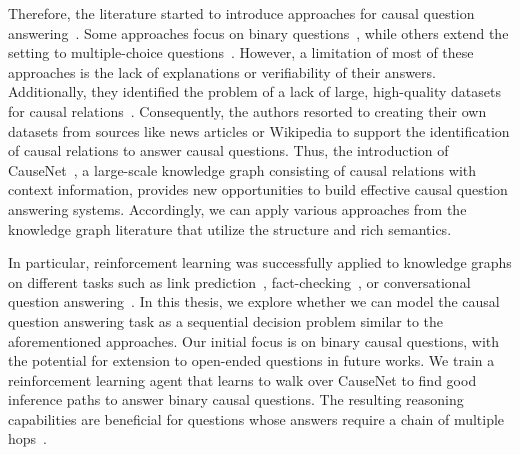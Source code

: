 Therefore, the literature started to introduce approaches for causal question answering~\cite{SharpCausalQAEmbeddings2016, HassanzadeshCausalQA2019, KayeshCausalTransfer2020, DalalCausalQAISWC2021}. 
Some approaches focus on binary questions~\cite{HassanzadeshCausalQA2019, KayeshCausalTransfer2020}, 
while others extend the setting to multiple-choice questions~\cite{SharpCausalQAEmbeddings2016, DalalCausalQAISWC2021}.
However, a limitation of most of these approaches is the lack of explanations or verifiability of their answers. 
Additionally, they identified the problem of a lack of large, high-quality datasets for causal relations~\cite{SharpCausalQAEmbeddings2016, HassanzadeshCausalQA2019, KayeshCausalTransfer2020}. 
Consequently, the authors resorted to creating their own datasets from sources like news articles or Wikipedia to support the identification of causal relations to answer causal questions. 
Thus, the introduction of CauseNet~\cite{Heindorf2020Causenet}, a large-scale knowledge graph consisting of causal relations with context information, provides new opportunities to build effective causal question answering systems. 
Accordingly, we can apply various approaches from the knowledge graph literature that utilize the structure and rich semantics.

In particular, reinforcement learning was successfully applied to knowledge graphs on different tasks such as link prediction~\cite{Xiong2017DeePpath}, 
fact-checking~\cite{Das2018Minerva}, or conversational question answering~\cite{Kaiser2021Reinforcement}. 
In this thesis, we explore whether we can model the
causal question answering task as a sequential decision problem similar to the aforementioned approaches.
Our initial focus is on binary causal questions, with the potential for extension to open-ended questions in future works.
We train a reinforcement learning agent that learns to walk over CauseNet to find good inference paths to answer binary causal questions.
 The resulting reasoning capabilities are beneficial for questions whose answers require a chain of multiple hops~\cite{Xiong2017DeePpath, Das2018Minerva, Wan2021GaussianPath}. 

